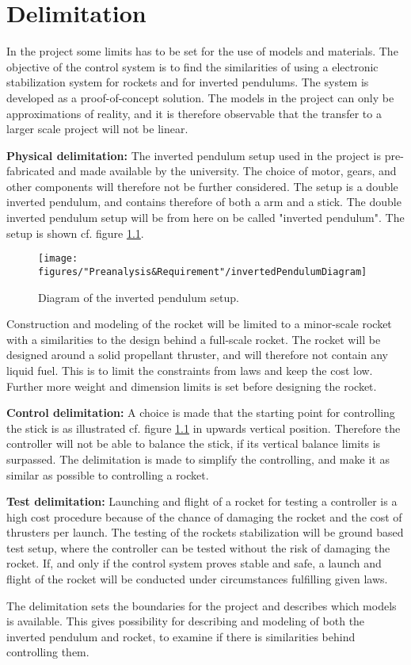 \chapter{Delimitation}
In the project some limits has to be set for the use of models and materials. The objective of the control system is to find the similarities of using a electronic stabilization system for rockets and for inverted pendulums. The system is developed as a proof-of-concept solution. The models in the project can only be approximations of reality, and it is therefore observable that the transfer to a larger scale project will not be linear.        

\textbf{Physical delimitation:}
The inverted pendulum setup used in the project is pre-fabricated and made available by the university.  The choice of motor, gears, and other components will therefore not be further considered. The setup is a double inverted pendulum, and contains therefore of both a arm and a stick. The double inverted pendulum setup will be from here on be called "inverted pendulum". The setup is shown cf. figure \ref{fig:InvertedPendulum1}.
\begin{figure}[htbp]
	\centering
	\texttt{[image: figures/"Preanalysis\&Requirement"/invertedPendulumDiagram]}
	\caption{Diagram of the inverted pendulum setup\citep{web:BalancingStick2008}.} \label{fig:InvertedPendulum1}
\end{figure}


Construction and modeling of the rocket will be limited to a minor-scale rocket with a similarities to the design behind a full-scale rocket. The rocket will be designed around a solid propellant thruster, and will therefore not contain any liquid fuel. This is to limit the constraints from laws and keep the cost low. Further more weight and dimension limits is set before designing the rocket.
 
 
\textbf{Control delimitation:}
A choice is made that the starting point for controlling the stick is as illustrated cf. figure \ref{fig:InvertedPendulum1} in upwards vertical position. Therefore the controller will not be able to balance the stick, if its vertical balance limits is surpassed. The delimitation is made to simplify the controlling, and make it as similar as possible to controlling a rocket. 
 
 
\textbf{Test delimitation:}
Launching and flight of a rocket for testing a controller is a high cost procedure because of the chance of damaging the rocket and the cost of thrusters per launch. The testing of the rockets stabilization will be ground based test setup, where the controller can be tested without the risk of damaging the rocket. If, and only if the control system proves stable and safe, a launch and flight of the rocket will be conducted under circumstances fulfilling given laws.   
\bigbreak


The delimitation sets the boundaries for the project and describes which models is available. This gives possibility for describing and modeling of both the inverted pendulum and rocket, to examine if there is similarities behind controlling them. 